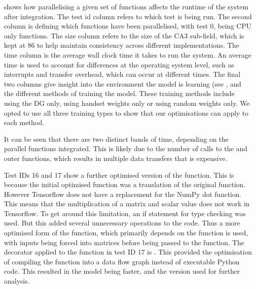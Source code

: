  shows how parallelising a given set of functions affects the runtime of the system after integration. 
The test id column refers to which test is being run.
The second column is defining which functions have been parallelised, with test 0, being CPU only functions.
The size column refers to the size of the CA3 sub-field, which is kept at 86 to help maintain consistency across different implementations.
The time column is the average wall clock time it takes to run the system. 
An average time is used to account for differences at the operating system level, such as interrupts and transfer overhead, which can occur at different times.
The final two columns give insight into the environment the model is learning (see , and the different methods of training the model.
These training methods include using the DG only, using handset weights only or using random weights only.
We opted to use all three training types to show that our optimisations can apply to each method.

It can be seen that there are two distinct bands of time, depending on the parallel functions integrated.
This is likely due to the number of calls to the  and outer functions, which results in multiple data transfers that is expensive.

Test IDs 16 and 17 show a further optimised version of the  function.
This is because the initial optimised  function was a translation of the original  function.
However Tensorflow does not have a replacement for the NumPy dot function.
This means that the multiplication of a matrix and scalar value does not work in Tensorflow.
To get around this limitation, an if statement for type checking was used.
But this added several unnecessary operations to the code.
Thus a more optimised form of the function, which primarily depends on the  function is used, with inputs being forced into matrices before being passed to the function.
The decorator applied to the  function in test ID 17 is . This provided the optimisation of compiling the function into a data flow graph instead of executable Python code.   
This resulted in the model being faster, and the version used for further analysis.
